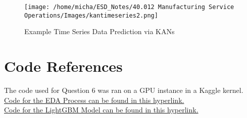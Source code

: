 \documentclass[12pt]{article}
\begin{document}
\begin{figure}[H]
    \centering
    \texttt{[image: /home/micha/ESD\_Notes/40.012 Manufacturing Service Operations/Images/kantimeseries2.png]}
    \caption{Example Time Series Data Prediction via KANs}
    \label{fig:6-kanstimeseries}
\end{figure} 

\newpage

\section*{Code References}

The code used for Question 6 was ran on a GPU instance in a Kaggle kernel. \\

\noindent \href{https://www.kaggle.com/code/michaelhoon/eda-for-m5}{Code for the EDA Process can be found in this hyperlink.} \\ 

\noindent \href{https://github.com/cnicault/m5-forecasting-accuracy}{Code for the LightGBM Model can be found in this hyperlink.}




\end{document}

